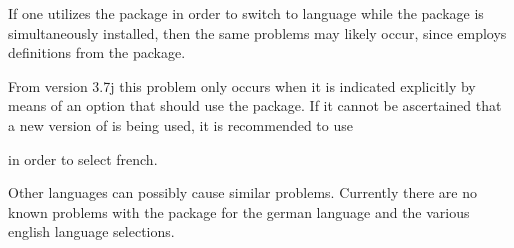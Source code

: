 If one utilizes the  package in order to
switch to language  while the package
 is simultaneously installed, then the
same problems may likely occur, since  employs definitions
from the  package. 
%
\iffalse%
If the package \Package{french} is not
installed then there are no problems. Aimilarly, there is no problem if for
\Package{babel} instead of \PValue{french} other languages like
\PValue{acadian}, \PValue{canadien}, \PValue{francais} or \PValue{frenchb} are
chosen.
\fi

From  version 3.7j this problem only occurs when it is
indicated explicitly by means of an option that  should use the
 package.  If it cannot be ascertained that a new version of
 is being used, it is recommended to use
\begin{lstcode}
  \usepackage[...,frenchb,...]{babel}
\end{lstcode}
in order to select french.

Other languages can possibly cause similar problems. Currently there
are no known problems with the  package for the
german language and the various english language selections.

